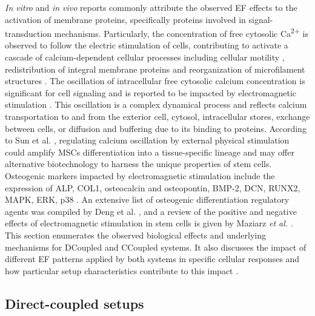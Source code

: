 \textit{In vitro} and \textit{in vivo} reports commonly attribute the observed \ac{EF} effects to the activation of membrane proteins, specifically proteins involved in signal-transduction mechanisms. Particularly, the concentration of free cytosolic Ca\textsuperscript{2+} is observed to follow the electric stimulation of cells, contributing to activate a cascade of calcium-dependent cellular processes \cite{Pall2013-wt, De_Menorval2016-fv, Brighton2001-fk, Burke2017-su, Cho1999-hr} including cellular motility \cite{Onuma1988-eu}, redistribution of integral membrane proteins and reorganization of microfilament structures \cite{Cho1999-hr}. The oscillation of intracellular free cytosolic calcium concentration is significant for cell signaling and is reported to be impacted by electromagnetic stimulation \cite{Sun2007-tx}. This oscillation is a complex dynamical process and reflects calcium transportation to and from the exterior cell, cytosol, intracellular stores, exchange between cells, or diffusion and buffering due to its binding to proteins. According to Sun et al. \cite{Sun2007-tx}, regulating calcium oscillation by external physical stimulation could amplify \ac{MSCs} differentiation into a tissue-specific lineage and may offer alternative biotechnology to harness the unique properties of stem cells. Osteogenic markers impacted by electromagnetic stimulation include the expression of \acs{ALP}, \acs{COL1}, osteocalcin and osteopontin, BMP-2, DCN, \acs{RUNX2}, MAPK, ERK, p38 \cite{Guillot-Ferriols2022-wn}. An extensive list of osteogenic differentiation regulatory agents was compiled by Deng et al. \cite{Deng2008-xs}, and a review of the positive and negative effects of electromagnetic stimulation in stem cells is given by Maziarz \textit{et al.} \cite{Maziarz2016-fd}. This section enumerates the observed biological effects and underlying mechanisms for \ac{DCoupled} and \ac{CCoupled} systems. It also discusses the impact of different \ac{EF} patterns applied by both systems in specific cellular responses and how particular setup characteristics contribute to this impact \cite{Meng2021-qn}.


\subsection{Direct-coupled setups}


